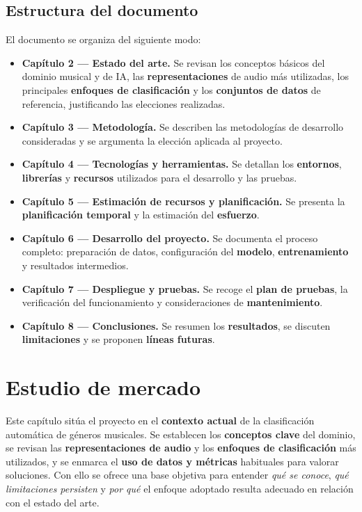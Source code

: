\documentclass[12pt,twoside]{article}
\begin{document}
\subsection{Estructura del documento}

El documento se organiza del siguiente modo:
\begin{itemize}
  \item \textbf{Capítulo 2 — Estado del arte.} Se revisan los conceptos básicos del dominio musical y de IA, las \textbf{representaciones} de audio más utilizadas, los principales \textbf{enfoques de clasificación} y los \textbf{conjuntos de datos} de referencia, justificando las elecciones realizadas.
  \item \textbf{Capítulo 3 — Metodología.} Se describen las metodologías de desarrollo consideradas y se argumenta la elección aplicada al proyecto.
  \item \textbf{Capítulo 4 — Tecnologías y herramientas.} Se detallan los \textbf{entornos}, \textbf{librerías} y \textbf{recursos} utilizados para el desarrollo y las pruebas.
  \item \textbf{Capítulo 5 — Estimación de recursos y planificación.} Se presenta la \textbf{planificación temporal} y la estimación del \textbf{esfuerzo}.
  \item \textbf{Capítulo 6 — Desarrollo del proyecto.} Se documenta el proceso completo: preparación de datos, configuración del \textbf{modelo}, \textbf{entrenamiento} y resultados intermedios.
  \item \textbf{Capítulo 7 — Despliegue y pruebas.} Se recoge el \textbf{plan de pruebas}, la verificación del funcionamiento y consideraciones de \textbf{mantenimiento}.
  \item \textbf{Capítulo 8 — Conclusiones.} Se resumen los \textbf{resultados}, se discuten \textbf{limitaciones} y se proponen \textbf{líneas futuras}.
\end{itemize}


\section{Estudio de mercado}

Este capítulo sitúa el proyecto en el \textbf{contexto actual} de la clasificación automática de géneros musicales. Se establecen los \textbf{conceptos clave} del dominio, se revisan las \textbf{representaciones de audio} y los \textbf{enfoques de clasificación} más utilizados, y se enmarca el \textbf{uso de datos y métricas} habituales para valorar soluciones. Con ello se ofrece una base objetiva para entender \textit{qué se conoce}, \textit{qué limitaciones persisten} y \textit{por qué} el enfoque adoptado resulta adecuado en relación con el estado del arte.
\end{document}
